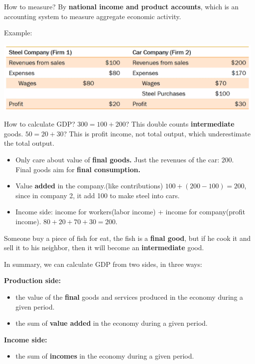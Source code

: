 \documentclass[11pt, a4paper]{ECON2123}
\begin{document}
\begin{spacing}{1.5}
    How to measure? By {\bf national income and product accounts}, 
    which is an accounting system to measure aggregate economic activity.

    Example: 
    \begin{center}
        \includegraphics[scale=0.8]{images/0102-GDP-1.png}
    \end{center}
    How to calculate GDP? 
    $300=100+200$? This double counts {\bf intermediate} goods.
    $50=20+30$? This is profit income, not total output, which 
    underestimate the total output.
    \begin{itemize}
        \item Only care about value of {\bf final goods.} 
        Just the revenues of the car: $200$.
        Final goods aim for {\bf final consumption.}
        \item Value {\bf added} in the company.(like contributions)
        $100+(200-100)=200$, since in company 2, it add 
        100 to make steel into cars.
        \item Income side: income for workers(labor income) + 
        income for company(profit income).
        $80+20+70+30=200$.
    \end{itemize}

    Someone buy a piece of fish for eat, the fish is a {\bf final good},
    but if he cook it and sell it to his neighbor, then it will 
    become an {\bf intermediate} good.

    In summary, we can calculate GDP from two sides, in three ways:

    {\bf Production side:}
    \begin{itemize}
        \item the value of the {\bf final} goods and services produced in 
        the economy during a given period.
        \item the sum of {\bf value added} in the economy during a given period.
    \end{itemize}

    {\bf Income side:}
    \begin{itemize}
        \item the sum of {\bf incomes} in the economy during a given period.
    \end{itemize}


\end{spacing}
\end{document}
